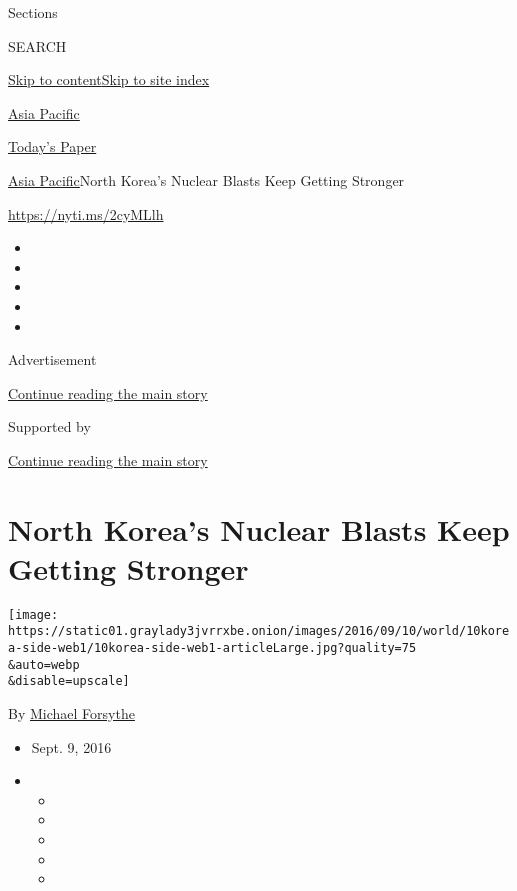 Sections

SEARCH

\protect\hyperlink{site-content}{Skip to
content}\protect\hyperlink{site-index}{Skip to site index}

\href{https://www.nytimes3xbfgragh.onion/section/world/asia}{Asia
Pacific}

\href{https://myaccount.nytimes3xbfgragh.onion/auth/login?response_type=cookie\&client_id=vi}{}

\href{https://www.nytimes3xbfgragh.onion/section/todayspaper}{Today's
Paper}

\href{/section/world/asia}{Asia Pacific}\textbar{}North Korea's Nuclear
Blasts Keep Getting Stronger

\url{https://nyti.ms/2cyMLlh}

\begin{itemize}
\item
\item
\item
\item
\item
\end{itemize}

Advertisement

\protect\hyperlink{after-top}{Continue reading the main story}

Supported by

\protect\hyperlink{after-sponsor}{Continue reading the main story}

\hypertarget{north-koreas-nuclear-blasts-keep-getting-stronger}{%
\section{North Korea's Nuclear Blasts Keep Getting
Stronger}\label{north-koreas-nuclear-blasts-keep-getting-stronger}}

\texttt{[image: https://static01.graylady3jvrrxbe.onion/images/2016/09/10/world/10korea-side-web1/10korea-side-web1-articleLarge.jpg?quality=75\\\&auto=webp\\\&disable=upscale]}

By \href{http://www.nytimes3xbfgragh.onion/by/michael-forsythe}{Michael
Forsythe}

\begin{itemize}
\item
  Sept. 9, 2016
\item
  \begin{itemize}
  \item
  \item
  \item
  \item
  \item
  \end{itemize}
\end{itemize}

